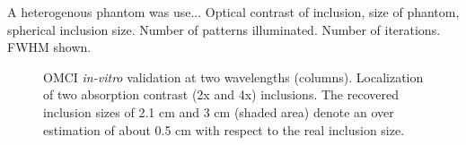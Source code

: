 A heterogenous phantom was use...
Optical contrast of inclusion, size of phantom, spherical inclusion size.
Number of patterns illuminated. 
Number of iterations.
FWHM shown. 
\begin{figure}[]
    \begin{center}
    \end{center}
    \caption{OMCI \textit{in-vitro} validation at two wavelengths (columns). Localization of two absorption contrast (2x and 4x) inclusions. The recovered inclusion sizes of 2.1 cm and 3 cm (shaded area) denote an over estimation of about 0.5 cm with respect to the real inclusion size.} 
    \label{fig:PhantomResults}
\end{figure} 




